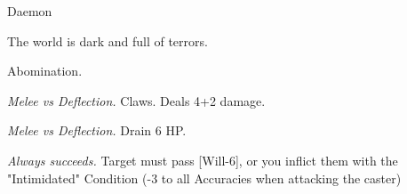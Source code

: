 \begin{monsterboxbg}{Daemon}

    The world is dark and full of terrors.
    
    \rpghline
    \stats[
        STR = \stat{14}, 
        DEX = \stat{16},
        CON = \stat{10},
        INT = \stat{14},
        WIS = \stat{10},
        CHA = \stat{12},
    ]
    \rpghline

    \basics[
    armorclass = 0,
    hitpoints  = 23,
    focus      = 5,
    defenses   = {Deflection 4, Reflex 4, Fortitude 4, Will 3}
    ]
    \rpghline

    \details[%
    skills = {Athletics 2},
    accuracies = {Melee 6, Ranged 0},
    ]
    \rpghline%
    \begin{rpg-monsteraction}
        Abomination.
    \end{rpg-monsteraction}

    

    \begin{rpg-monsteraction}
        \textit{Melee vs Deflection.} Claws. Deals 4+2 damage.
    \end{rpg-monsteraction}

    \begin{rpg-monsteraction}
        \textit{Melee vs Deflection.} Drain 6 HP.
    \end{rpg-monsteraction}

    \begin{rpg-monsteraction}[Intimidate]
        \textit{Always succeeds.} Target must pass [Will-6], or you inflict them with the "Intimidated" Condition (-3 to all Accuracies when attacking the caster)
    \end{rpg-monsteraction}


    \begin{rpg-monsteraction}[Darkvision]
    \end{rpg-monsteraction}


\end{monsterboxbg}




